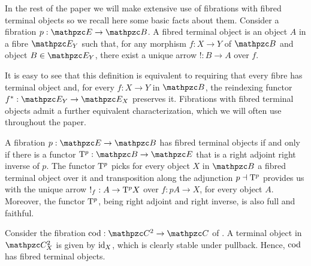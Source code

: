 \documentclass{lmcs} %
\theoremstyle{plain}\newtheorem{satz}[thm]{Satz} %
\begin{document}
In the rest of the paper we will make extensive use of fibrations with fibred terminal objects so we recall here some basic facts about them. 
%
Consider a fibration $p : \ct{E}\to\ct{B}$. 
A fibred terminal object is 
an object $A$ in a fibre $\fibre{\ct{E}}{Y}$ such that, for any morphism $f:X\to Y$ of $\ct{B}$ and object $B\in \fibre{\ct{E}}{Y}$, there exist a unique arrow $!:B\to A$ over $f$.

It is easy to see that this definition is equivalent to requiring that every fibre has terminal object and, for every $f:X\to Y$ in $\ct{B}$, the reindexing functor $\reind{f}:\fibre{\ct{E}}{Y}\to\fibre{\ct{E}}{X}$ preserves it. 
Fibrations with fibred terminal objects admit a further equivalent characterization, which we will often use throughout the paper. 

\begin{rem}
  A fibration $p : \ct{E}\to\ct{B}$ has fibred terminal objects if and only if there is a functor 
  $\term{p} : \ct{B}\to\ct{E}$ that is a right adjoint right inverse of $p$. 
  The functor $\mathrm{T}^{p}$ picks for every object $X$ in $\ct{B}$ a fibred terminal object over it and transposition along the adjunction $p\dashv\mathrm{T}^{p}$ provides us with the unique arrow $!_f : A \to \mathrm{T}^{p} X$ over $f : pA\to X$, for every object $A$. 
Moreover, the functor $\mathrm{T}^{p}$, being right adjoint and right inverse, is also full and faithful. 
\end{rem}
			
			\begin{exa}\label{ex:term}
				Consider the fibration $\cod:\Arr{\ct{C}}\to\ct{C}$ of . A terminal object in $\fibre{\Arr{\ct{C}}}{X}$ is given by $\mathrm{id}_{X}$, which is clearly stable under pullback. Hence, $\mathop{\mathrm{cod}}\nolimits$ has fibred terminal objects.
			\end{exa}	
			
\end{document}
